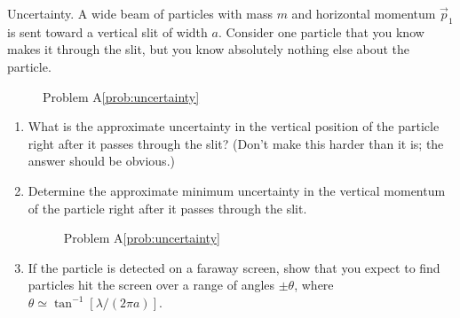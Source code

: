 \begin{aproblem}{Uncertainty.}  
  A wide beam of particles with mass $m$ and horizontal momentum
  $\vec{p}_1$ is sent toward a vertical slit of width $a$.  Consider
  one particle that you know makes it through the slit, but you know
  absolutely nothing else about the particle.
  \begin{figure}[h]
    \begin{center}
      \caption{Problem A\ref{prob:uncertainty}}
    \end{center}
  \end{figure}
  \begin{enumerate}
  \item What is the approximate uncertainty in the vertical position
    of the particle right after it passes through the slit? (Don't
    make this harder than it is; the answer should be obvious.)
  \item Determine the approximate minimum uncertainty in the vertical
    momentum of the particle right after it passes through the slit.
    
    \begin{figure}[h]
      \begin{center}
        \caption{Problem A\ref{prob:uncertainty}}
      \end{center}
    \end{figure}
  \item If the particle is detected on a faraway screen, show that you
    expect to find particles hit the screen over a range of angles
    $\pm \theta$, where $\theta \simeq \tan^{-1}[\lambda/(2\pi a)]$.
  \end{enumerate}
  \label{prob:uncertainty} 
\end{aproblem}


